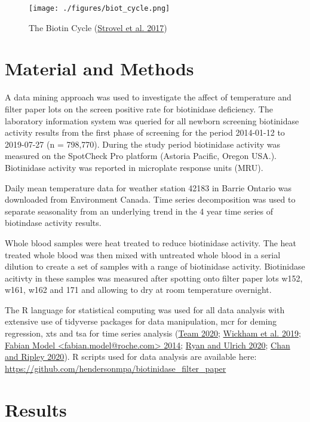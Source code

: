 \documentclass[review]{elsarticle}
\begin{document}
\begin{figure}[htbp]
\centering
\texttt{[image: ./figures/biot\_cycle.png]}
\caption{\label{fig:orgb68c26e}The Biotin Cycle (\hyperlink{citeproc_bib_item_4}{Strovel et al. 2017})}
\end{figure}

\section*{Material and Methods}
\label{sec:orgedf3066}
A data mining approach was used to investigate the affect of
temperature and filter paper lots on the screen positive rate for
biotinidase deficiency. The laboratory information system was queried
for all newborn screening biotinidase activity results from the first
phase of screening for the period 2014-01-12 to 2019-07-27 (n =
798,770). During the study period biotinidase activity was measured on
the SpotCheck Pro platform (Astoria Pacific, Oregon USA.). Biotinidase
activity was reported in microplate response units (MRU).

Daily mean temperature data for weather station 42183 in Barrie
Ontario was downloaded from Environment Canada. Time series
decomposition was used to separate seasonality from an underlying
trend in the 4 year time series of biotindase activity results.

Whole blood samples were heat treated to reduce biotinidase
activity. The heat treated whole blood was then mixed with untreated
whole blood in a serial dilution to create a set of samples with a
range of biotinidase activity. Biotinidase acitivty in these samples
was measured after spotting onto filter paper lots w152, w161, w162
and 171 and allowing to dry at room temperature overnight.

The R language for statistical computing was used for all data
analysis with extensive use of tidyverse packages for data
manipulation, mcr for deming regression, xts and tsa for time series
analysis (\hyperlink{citeproc_bib_item_5}{Team 2020}; \hyperlink{citeproc_bib_item_6}{Wickham et al. 2019}; \hyperlink{citeproc_bib_item_2}{Fabian Model <fabian.model@roche.com> 2014}; \hyperlink{citeproc_bib_item_3}{Ryan and Ulrich 2020}; \hyperlink{citeproc_bib_item_1}{Chan and Ripley 2020}). R scripts used for
data analysis are available here:
\url{https://github.com/hendersonmpa/biotinidase\_filter\_paper}

\section*{Results}
\label{sec:orgf745ecf}
\end{document}
